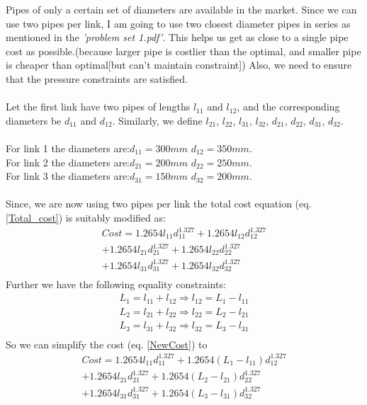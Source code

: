 \documentclass{homework}
\begin{document}
Pipes of only a certain set of diameters are available in the market.
Since we can use two pipes per link, I am going to use two closest diameter
pipes in series as mentioned in the \emph{'problem set 1.pdf'}. This helps us get as close to a single pipe cost as possible.(because larger pipe is costlier than the optimal, and smaller pipe is cheaper than optimal[but can't maintain constraint]) Also, we need to ensure that the pressure constraints are satisfied. \\\\
Let the first link have two pipes of lengths $l_{11}$ and $l_{12}$, and the corresponding diameters be $d_{11}$ and $d_{12}$. Similarly, we define $l_{21}$, $l_{22}$, $l_{31}$, $l_{32}$, $d_{21}$, $d_{22}$, $d_{31}$, $d_{32}$. \\\\
For link 1 the diameters are:\( d_{11} = 300 mm\) \(d_{12} = 350 mm\). \\
For link 2 the diameters are:\( d_{21} = 200 mm\) \(d_{22} = 250 mm\). \\
For link 3 the diameters are:\( d_{31} = 150 mm\) \(d_{32} = 200 mm\). \\\\
Since, we are now using two pipes per link the total cost equation (eq. \ref{Total_cost}) is suitably modified as:
\begin{equation}\label{NewCost}
\begin{split}
Cost = 1.2654l_{11}d_{11}^{1.327} + 1.2654l_{12}d_{12}^{1.327} \\
+ 1.2654l_{21}d_{21}^{1.327} + 1.2654l_{22}d_{22}^{1.327} \\
+ 1.2654l_{31}d_{31}^{1.327} + 1.2654l_{32}d_{32}^{1.327} \\
\end{split}
\end{equation}
Further we have the following equality constraints:
\begin{equation}\label{NewEC}
\begin{split}
 L_1 = l_{11} + l_{12} \Rightarrow l_{12} = L_1 - l_{11} \\
 L_2 = l_{21} + l_{22} \Rightarrow l_{22} = L_2 - l_{21} \\
 L_3 = l_{31} + l_{32} \Rightarrow l_{32} = L_3 - l_{31}  \\
\end{split}
\end{equation}
So we can simplify the cost (eq. \ref{NewCost}) to
\begin{equation}\label{NewEC}
\begin{split}
Cost = 1.2654l_{11}d_{11}^{1.327} + 1.2654(L_1 - l_{11})d_{12}^{1.327} \\
+ 1.2654l_{21}d_{21}^{1.327} + 1.2654(L_2 - l_{21})d_{22}^{1.327} \\
+ 1.2654l_{31}d_{31}^{1.327} + 1.2654(L_3 - l_{31})d_{32}^{1.327} \\
\end{split}
\end{equation}
\end{document}

